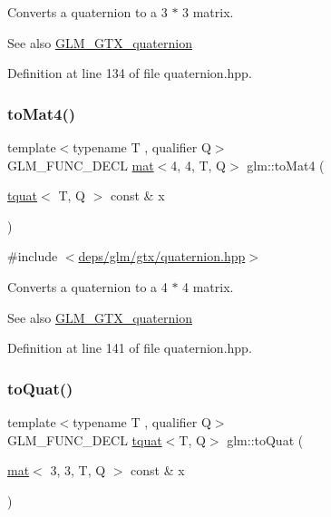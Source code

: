 Converts a quaternion to a 3 $\ast$ 3 matrix.

\begin{DoxySeeAlso}{See also}
\hyperlink{group__gtx__quaternion}{G\+L\+M\+\_\+\+G\+T\+X\+\_\+quaternion} 
\end{DoxySeeAlso}


Definition at line 134 of file quaternion.\+hpp.

\mbox{\label{group__gtx__quaternion_ga1fa0fb798c2715148e2e0358442bf895}} 
\subsubsection{\texorpdfstring{to\+Mat4()}{toMat4()}}
{\footnotesize\ttfamily template$<$typename T , qualifier Q$>$ \\
G\+L\+M\+\_\+\+F\+U\+N\+C\+\_\+\+D\+E\+CL \hyperlink{structglm_1_1mat}{mat}$<$4, 4, T, Q$>$ glm\+::to\+Mat4 (\begin{DoxyParamCaption}\item[{\hyperlink{structglm_1_1tquat}{tquat}$<$ T, Q $>$ const \&}]{x }\end{DoxyParamCaption})}



{\ttfamily \#include $<$\hyperlink{gtx_2quaternion_8hpp}{deps/glm/gtx/quaternion.\+hpp}$>$}

Converts a quaternion to a 4 $\ast$ 4 matrix.

\begin{DoxySeeAlso}{See also}
\hyperlink{group__gtx__quaternion}{G\+L\+M\+\_\+\+G\+T\+X\+\_\+quaternion} 
\end{DoxySeeAlso}


Definition at line 141 of file quaternion.\+hpp.

\mbox{\label{group__gtx__quaternion_gae9be791077b7a612d9092a922bd13f86}} 
\subsubsection{\texorpdfstring{to\+Quat()}{toQuat()}\hspace{0.1cm}{\footnotesize\ttfamily [1/2]}}
{\footnotesize\ttfamily template$<$typename T , qualifier Q$>$ \\
G\+L\+M\+\_\+\+F\+U\+N\+C\+\_\+\+D\+E\+CL \hyperlink{structglm_1_1tquat}{tquat}$<$T, Q$>$ glm\+::to\+Quat (\begin{DoxyParamCaption}\item[{\hyperlink{structglm_1_1mat}{mat}$<$ 3, 3, T, Q $>$ const \&}]{x }\end{DoxyParamCaption})}



